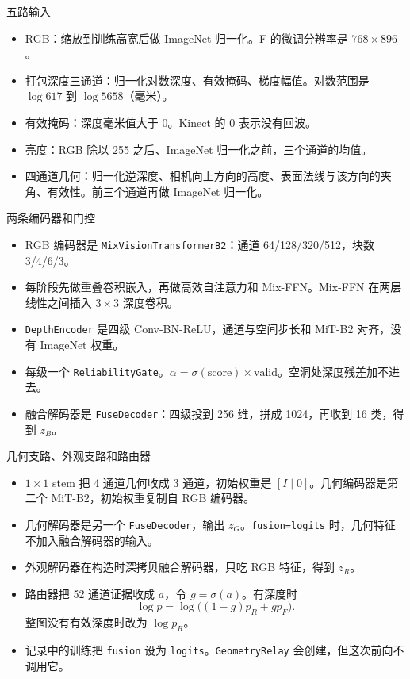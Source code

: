 \documentclass[aspectratio=169,11pt]{ctexbeamer}
\begin{document}
\begin{frame}{五路输入}
  \begin{itemize}
    \item RGB：缩放到训练高宽后做 ImageNet 归一化。F 的微调分辨率是 $768\times 896$。
    \item 打包深度三通道：归一化对数深度、有效掩码、梯度幅值。对数范围是 $\log 617$ 到 $\log 5658$（毫米）。
    \item 有效掩码：深度毫米值大于 0。Kinect 的 0 表示没有回波。
    \item 亮度：RGB 除以 255 之后、ImageNet 归一化之前，三个通道的均值。
    \item 四通道几何：归一化逆深度、相机向上方向的高度、表面法线与该方向的夹角、有效性。前三个通道再做 ImageNet 归一化。
  \end{itemize}
\end{frame}

\begin{frame}{两条编码器和门控}
  \begin{itemize}
    \item RGB 编码器是 \texttt{MixVisionTransformerB2}：通道 64/128/320/512，块数 3/4/6/3。
    \item 每阶段先做重叠卷积嵌入，再做高效自注意力和 Mix-FFN。Mix-FFN 在两层线性之间插入 $3\times 3$ 深度卷积。
    \item \texttt{DepthEncoder} 是四级 Conv-BN-ReLU，通道与空间步长和 MiT-B2 对齐，没有 ImageNet 权重。
    \item 每级一个 \texttt{ReliabilityGate}。$\alpha=\sigma(\mathrm{score})\times\mathrm{valid}$。空洞处深度残差加不进去。
    \item 融合解码器是 \texttt{FuseDecoder}：四级投到 256 维，拼成 1024，再收到 16 类，得到 $z_B$。
  \end{itemize}
\end{frame}

\begin{frame}{几何支路、外观支路和路由器}
  \begin{itemize}
    \item $1\times 1$ stem 把 4 通道几何收成 3 通道，初始权重是 $[I\mid 0]$。几何编码器是第二个 MiT-B2，初始权重复制自 RGB 编码器。
    \item 几何解码器是另一个 \texttt{FuseDecoder}，输出 $z_G$。\texttt{fusion=logits} 时，几何特征不加入融合解码器的输入。
    \item 外观解码器在构造时深拷贝融合解码器，只吃 RGB 特征，得到 $z_R$。
    \item 路由器把 52 通道证据收成 $a$，令 $g=\sigma(a)$。有深度时
      \[
        \log p=\log\big((1-g)p_R+g p_F\big).
      \]
      整图没有有效深度时改为 $\log p_R$。
    \item 记录中的训练把 \texttt{fusion} 设为 \texttt{logits}。\texttt{GeometryRelay} 会创建，但这次前向不调用它。
  \end{itemize}
\end{frame}
\end{document}
